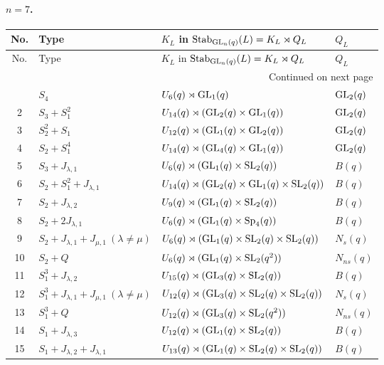 \paragraph{$n=7$.}
\begin{longtable}{@{}c p{} p{} p{}@{}}
\toprule
No. & Type & $K_L$ in $\mathrm{Stab}_{\mathrm{GL}_n(q)}(L)=K_L\rtimes Q_L$ & $Q_L$ \\
\midrule
\endfirsthead
\toprule
No. & Type & $K_L$ in $\mathrm{Stab}_{\mathrm{GL}_n(q)}(L)=K_L\rtimes Q_L$ & $Q_L$ \\
\midrule
\endhead
\midrule
\multicolumn{4}{r}{Continued on next page}\\
\midrule
\endfoot
\bottomrule
\endlastfoot
1 & \(S_4\) & $U_6(q)\rtimes \mathrm{GL}_1(q)$ & $\mathrm{GL}_2(q)$ \\
2 & \(S_3 + S_1^2\) & $U_{14}(q)\rtimes (\mathrm{GL}_2(q)\times \mathrm{GL}_1(q))$ & $\mathrm{GL}_2(q)$ \\
3 & \(S_2^2 + S_1\) & $U_{12}(q)\rtimes (\mathrm{GL}_1(q)\times \mathrm{GL}_2(q))$ & $\mathrm{GL}_2(q)$ \\
4 & \(S_2 + S_1^4\) & $U_{14}(q)\rtimes (\mathrm{GL}_4(q)\times \mathrm{GL}_1(q))$ & $\mathrm{GL}_2(q)$ \\
5 & \(S_3 + J_{\lambda,1}\) & $U_6(q)\rtimes (\mathrm{GL}_1(q)\times \mathrm{SL}_2(q))$ & $B(q)$ \\
6 & \(S_2 + S_1^2 + J_{\lambda,1}\) & $U_{14}(q)\rtimes (\mathrm{GL}_2(q)\times \mathrm{GL}_1(q)\times \mathrm{SL}_2(q))$ & $B(q)$ \\
7 & \(S_2 + J_{\lambda,2}\) & $U_9(q)\rtimes (\mathrm{GL}_1(q)\times \mathrm{SL}_2(q))$ & $B(q)$ \\
8 & \(S_2 + 2J_{\lambda,1}\) & $U_6(q)\rtimes (\mathrm{GL}_1(q)\times \mathrm{Sp}_4(q))$ & $B(q)$ \\
9 & \(S_2 + J_{\lambda,1} + J_{\mu,1}\ (\lambda \ne \mu)\) & $U_6(q)\rtimes (\mathrm{GL}_1(q)\times \mathrm{SL}_2(q)\times \mathrm{SL}_2(q))$ & $N_s(q)$ \\
10 & \(S_2 + Q\) & $U_6(q)\rtimes (\mathrm{GL}_1(q)\times \mathrm{SL}_2(q^2))$ & $N_{ns}(q)$ \\
11 & \(S_1^3 + J_{\lambda,2}\) & $U_{15}(q)\rtimes (\mathrm{GL}_3(q)\times \mathrm{SL}_2(q))$ & $B(q)$ \\
12 & \(S_1^3 + J_{\lambda,1} + J_{\mu,1}\ (\lambda \ne \mu)\) & $U_{12}(q)\rtimes (\mathrm{GL}_3(q)\times \mathrm{SL}_2(q)\times \mathrm{SL}_2(q))$ & $N_s(q)$ \\
13 & \(S_1^3 + Q\) & $U_{12}(q)\rtimes (\mathrm{GL}_3(q)\times \mathrm{SL}_2(q^2))$ & $N_{ns}(q)$ \\
14 & \(S_1 + J_{\lambda,3}\) & $U_{12}(q)\rtimes (\mathrm{GL}_1(q)\times \mathrm{SL}_2(q))$ & $B(q)$ \\
15 & \(S_1 + J_{\lambda,2} + J_{\lambda,1}\) & $U_{13}(q)\rtimes (\mathrm{GL}_1(q)\times \mathrm{SL}_2(q)\times \mathrm{SL}_2(q))$ & $B(q)$ \\

\end{longtable}
